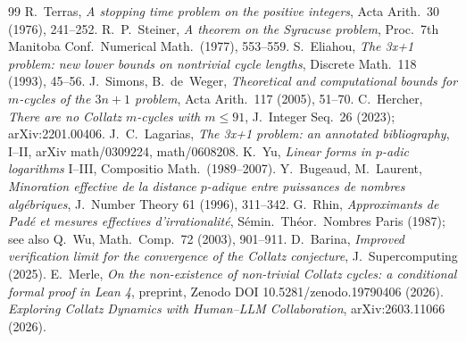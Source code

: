 \documentclass[11pt]{article}
\theoremstyle{remark}
\begin{document}
\begin{thebibliography}{99}
 R.~Terras, \emph{A stopping time problem on the positive integers}, Acta Arith.\ 30 (1976), 241--252.
 R.~P.~Steiner, \emph{A theorem on the Syracuse problem}, Proc.\ 7th Manitoba Conf.\ Numerical Math.\ (1977), 553--559.
 S.~Eliahou, \emph{The 3x+1 problem: new lower bounds on nontrivial cycle lengths}, Discrete Math.\ 118 (1993), 45--56.
 J.~Simons, B.~de~Weger, \emph{Theoretical and computational bounds for $m$-cycles of the $3n+1$ problem}, Acta Arith.\ 117 (2005), 51--70.
 C.~Hercher, \emph{There are no Collatz $m$-cycles with $m \le 91$}, J.\ Integer Seq.\ 26 (2023); arXiv:2201.00406.
 J.~C.~Lagarias, \emph{The 3x+1 problem: an annotated bibliography}, I--II, arXiv math/0309224, math/0608208.
 K.~Yu, \emph{Linear forms in $p$-adic logarithms} I--III, Compositio Math.\ (1989--2007).
 Y.~Bugeaud, M.~Laurent, \emph{Minoration effective de la distance $p$-adique entre puissances de nombres alg\'ebriques}, J.\ Number Theory 61 (1996), 311--342.
 G.~Rhin, \emph{Approximants de Pad\'e et mesures effectives d'irrationalit\'e}, S\'emin.\ Th\'eor.\ Nombres Paris (1987); see also Q.~Wu, Math.\ Comp.\ 72 (2003), 901--911.
 D.~Barina, \emph{Improved verification limit for the convergence of the Collatz conjecture}, J.\ Supercomputing (2025).
 E.~Merle, \emph{On the non-existence of non-trivial Collatz cycles: a conditional formal proof in Lean 4}, preprint, Zenodo DOI 10.5281/zenodo.19790406 (2026).
 \emph{Exploring Collatz Dynamics with Human--LLM Collaboration}, arXiv:2603.11066 (2026).
\end{thebibliography}
\end{document}
